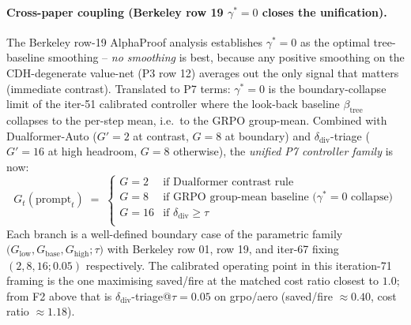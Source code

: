 \documentclass{article}
\begin{document}
\paragraph{Cross-paper coupling (Berkeley row 19 $\gamma^*{=}0$ closes the unification).}
The Berkeley row-19 AlphaProof analysis \citep{alphaproof2025nature}
establishes $\gamma^*{=}0$ as the optimal tree-baseline smoothing --
\emph{no smoothing} is best, because any positive smoothing on the
CDH-degenerate value-net (P3 row 12) averages out the only signal
that matters (immediate contrast). Translated to P7 terms:
$\gamma^*{=}0$ is the boundary-collapse limit of the iter-51
calibrated controller where the look-back baseline $\beta_{\mathrm{tree}}$
collapses to the per-step mean, i.e.\ to the GRPO group-mean.
Combined with Dualformer-Auto ($G'{=}2$ at contrast, $G{=}8$ at
boundary) and $\delta_{\mathrm{div}}$-triage ($G'{=}16$ at high
headroom, $G{=}8$ otherwise), the \emph{unified P7 controller family}
is now:
\begin{equation*}
G_t(\mathrm{prompt}_t) \;=\; \begin{cases}
G{=}2  & \text{if Dualformer contrast rule} \\
G{=}8  & \text{if GRPO group-mean baseline ($\gamma^*{=}0$ collapse)} \\
G{=}16 & \text{if $\delta_{\mathrm{div}} \geq \tau$} \\
\end{cases}
\end{equation*}
Each branch is a well-defined boundary case of the parametric family
$\bigl(G_{\mathrm{low}}, G_{\mathrm{base}}, G_{\mathrm{high}}; \tau\bigr)$
with Berkeley row 01, row 19, and iter-67 fixing
$(2, 8, 16; 0.05)$ respectively. The calibrated operating point in
this iteration-71 framing is the one maximising saved/fire at the matched
cost ratio closest to $1.0$; from F2 above that is
$\delta_{\mathrm{div}}$-triage@$\tau{=}0.05$ on grpo/aero
(saved/fire $\approx 0.40$, cost ratio $\approx 1.18$).
\end{document}
